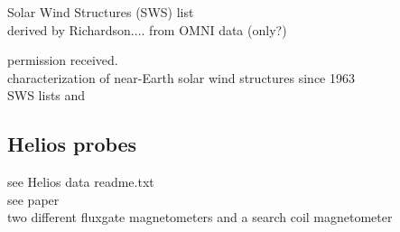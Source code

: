 Solar Wind Structures (SWS) list\\
derived by Richardson.... from OMNI data (only?)

permission received.\\

characterization of near-Earth solar wind structures since 1963\\
SWS lists \citep{Richardson2000} and \citep{Richardson2012}


\subsection{Helios probes}
\label{sec:helios_probes}

see Helios data readme.txt\\
see paper\\

two different fluxgate magnetometers and a search coil magnetometer\\

